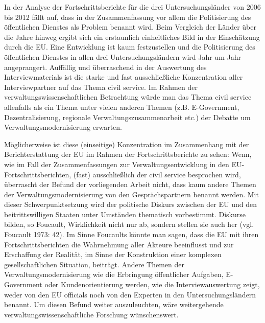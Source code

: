 In der Analyse der Fortschrittsberichte für die drei Untersuchungsländer von 2006 bis 2012 fällt auf, dass in der Zusammenfassung vor allem die Politisierung des öffentlichen Dienstes als Problem benannt wird. Beim Vergleich der Länder über die Jahre hinweg ergibt sich ein erstaunlich einheitliches Bild in der Einschätzung durch die EU. Eine Entwicklung ist kaum festzustellen und die Politisierung des öffentlichen Dienstes in allen drei Untersuchungsländern wird Jahr um Jahr angeprangert. Auffällig und überraschend in der Auswertung des Interviewmaterials ist die starke und fast ausschließliche Konzentration aller Interviewpartner auf das Thema civil service. Im Rahmen der verwaltungswissenschaftlichen Betrachtung würde man das Thema civil service allenfalls als ein Thema unter vielen anderen Themen (z.B. E-Government, Dezentralisierung, regionale Verwaltungszusammenarbeit etc.) der Debatte um Verwaltungsmodernisierung erwarten.\par
Möglicherweise ist diese (einseitige) Konzentration im Zusammenhang mit der Berichterstattung der EU im Rahmen der Fortschrittsberichte zu sehen: Wenn, wie im Fall der Zusammenfassungen zur Verwaltungsentwicklung in den EU-Fortschrittsberichten, (fast) ausschließlich der civil service besprochen wird, überrascht der Befund der vorliegenden Arbeit nicht, dass kaum andere Themen der Verwaltungsmodernisierung von den Gesprächspartnern benannt werden. Mit dieser Schwerpunktsetzung wird der politische Diskurs zwischen der EU und den beitrittswilligen Staaten unter Umständen thematisch vorbestimmt. Diskurse bilden, so Foucault, Wirklichkeit nicht nur ab, sondern stellen sie auch her (vgl. Foucault 1973: 42). Im Sinne Foucaults könnte man sagen, dass die EU mit ihren Fortschrittsberichten die Wahrnehmung aller Akteure beeinflusst und zur Erschaffung der Realität, im Sinne der Konstruktion einer komplexen gesellschaftlichen Situation, beiträgt. Andere Themen der Verwaltungsmodernisierung wie die Erbringung öffentlicher Aufgaben, E-Government oder Kundenorientierung werden, wie die Interviewauswertung zeigt, weder von den EU officials noch von den Experten in den Untersuchungsländern benannt. Um diesen Befund weiter auszuleuchten, wäre weitergehende verwaltungswissenschaftliche Forschung wünschenswert. \par

